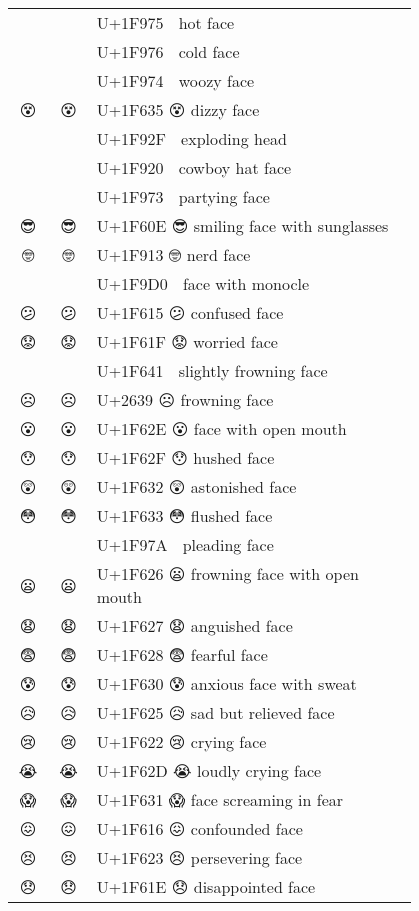 \documentclass[a4paper,12pt]{ltjarticle}
\newcommand{\fontA}[1]{{\fontspec[RawFeature={mode=harf,+dist,+ccmp}]{Segoe UI Emoji} #1}}
\newcommand{\fontB}[1]{{\fontspec[RawFeature={mode=harf,+dist,+ccmp}]{Noto Color Emoji} #1}}
\begin{document}
\begin{longtable}[c]{ccp{0.8\linewidth}}
\fontA{🥵}&\fontB{🥵}&U+1F975 🥵 hot face\\
\fontA{🥶}&\fontB{🥶}&U+1F976 🥶 cold face\\
\fontA{🥴}&\fontB{🥴}&U+1F974 🥴 woozy face\\
\fontA{😵}&\fontB{😵}&U+1F635 😵 dizzy face\\
\fontA{🤯}&\fontB{🤯}&U+1F92F 🤯 exploding head\\
\fontA{🤠}&\fontB{🤠}&U+1F920 🤠 cowboy hat face\\
\fontA{🥳}&\fontB{🥳}&U+1F973 🥳 partying face\\
\fontA{😎}&\fontB{😎}&U+1F60E 😎 smiling face with sunglasses\\
\fontA{🤓}&\fontB{🤓}&U+1F913 🤓 nerd face\\
\fontA{🧐}&\fontB{🧐}&U+1F9D0 🧐 face with monocle\\
\fontA{😕}&\fontB{😕}&U+1F615 😕 confused face\\
\fontA{😟}&\fontB{😟}&U+1F61F 😟 worried face\\
\fontA{🙁}&\fontB{🙁}&U+1F641 🙁 slightly frowning face\\
\fontA{☹}&\fontB{☹}&U+2639 ☹ frowning face\\
\fontA{😮}&\fontB{😮}&U+1F62E 😮 face with open mouth\\
\fontA{😯}&\fontB{😯}&U+1F62F 😯 hushed face\\
\fontA{😲}&\fontB{😲}&U+1F632 😲 astonished face\\
\fontA{😳}&\fontB{😳}&U+1F633 😳 flushed face\\
\fontA{🥺}&\fontB{🥺}&U+1F97A 🥺 pleading face\\
\fontA{😦}&\fontB{😦}&U+1F626 😦 frowning face with open mouth\\
\fontA{😧}&\fontB{😧}&U+1F627 😧 anguished face\\
\fontA{😨}&\fontB{😨}&U+1F628 😨 fearful face\\
\fontA{😰}&\fontB{😰}&U+1F630 😰 anxious face with sweat\\
\fontA{😥}&\fontB{😥}&U+1F625 😥 sad but relieved face\\
\fontA{😢}&\fontB{😢}&U+1F622 😢 crying face\\
\fontA{😭}&\fontB{😭}&U+1F62D 😭 loudly crying face\\
\fontA{😱}&\fontB{😱}&U+1F631 😱 face screaming in fear\\
\fontA{😖}&\fontB{😖}&U+1F616 😖 confounded face\\
\fontA{😣}&\fontB{😣}&U+1F623 😣 persevering face\\
\fontA{😞}&\fontB{😞}&U+1F61E 😞 disappointed face\\

\end{longtable}
\end{document}

